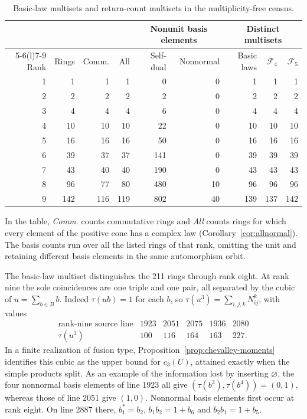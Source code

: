 \documentclass[11pt,reqno]{amsart}
\theoremstyle{definition}
\begin{document}
\begin{table}[htbp]\centering\small
\caption{Basic-law multisets and return-count multisets in the multiplicity-free census.}\label{tab:spectra-census}
\begin{tabular}{@{}rrrrrrrrr@{}}
\toprule
& & & & \multicolumn{2}{c}{Nonunit basis elements} & \multicolumn{3}{c}{Distinct multisets}\\
\cmidrule(lr){5-6}\cmidrule(l){7-9}
Rank & Rings & Comm. & All & Self-dual & Nonnormal & Basic laws & $\mathcal F_4$ & $\mathcal F_5$\\
\midrule
1&1&1&1&0&0&1&1&1\\
2&2&2&2&2&0&2&2&2\\
3&4&4&4&6&0&4&4&4\\
4&10&10&10&22&0&10&10&10\\
5&16&16&16&50&0&16&16&16\\
6&39&37&37&141&0&39&39&39\\
7&43&40&40&190&0&43&43&43\\
8&96&77&80&480&10&96&96&96\\
9&142&116&119&802&40&139&137&142\\
\bottomrule
\end{tabular}
\end{table}

In the table, \emph{Comm.} counts commutative rings and \emph{All} counts rings for which every element of the positive cone has a complex law (Corollary~\ref{cor:allnormal}). The basis counts run over all the listed rings of that rank, omitting the unit and retaining different basis elements in the same automorphism orbit.

The basic-law multiset distinguishes the 211 rings through rank eight. At rank nine the sole coincidences are one triple and one pair, all separated by the cubic of $u=\sum_{b\in B} b$. Indeed $\tau(ub)=1$ for each $b$, so $\tau(u^3)=\sum_{i,j,k}N_{ij}^k$, with values
\[
\begin{array}{c|rrr|rr}
 \text{rank-nine source line}&1923&2051&2075&1936&2080\\ \hline
 \tau(u^3)&100&116&164&163&227 .
\end{array}
\]
In a finite realization of fusion type, Proposition~\ref{prop:chevalley-moments} identifies this cubic as the upper bound for $c_3(U)$, attained exactly when the simple products split. As an example of the information lost by inserting $\varnothing$, the four nonnormal basis elements of line 1923 all give $(\tau(b^3),\tau(b^4))=(0,1)$, whereas those of line 2051 give $(1,0)$. Nonnormal basis elements first occur at rank eight. On line 2887 there, $b_1^*=b_2$, $b_1b_2=1+b_6$ and $b_2b_1=1+b_5$.
\end{document}
